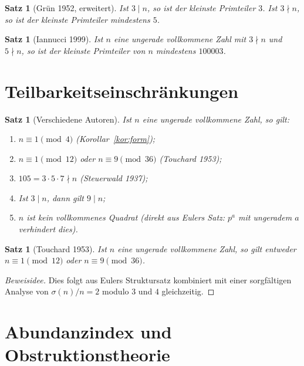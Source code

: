 \documentclass[12pt,a4paper]{amsart}
\newtheorem{satz}[theorem]{Satz}
\theoremstyle{definition}
\theoremstyle{remark}
\begin{document}
\begin{satz}[Grün 1952, erweitert]
Ist $3 \mid n$, so ist der kleinste Primteiler $3$.
Ist $3 \nmid n$, so ist der kleinste Primteiler mindestens $5$.
\end{satz}

\begin{satz}[Iannucci 1999]
Ist $n$ eine ungerade vollkommene Zahl mit $3 \nmid n$ und $5 \nmid n$,
so ist der kleinste Primteiler von $n$ mindestens $100003$.
\end{satz}

\section{Teilbarkeitseinschränkungen}

\begin{satz}[Verschiedene Autoren]
Ist $n$ eine ungerade vollkommene Zahl, so gilt:
\begin{enumerate}[label=(\roman*)]
  \item $n \equiv 1 \pmod{4}$ (Korollar~\ref{kor:form});
  \item $n \equiv 1 \pmod{12}$ oder $n \equiv 9 \pmod{36}$ (Touchard 1953);
  \item $105 = 3 \cdot 5 \cdot 7 \nmid n$ (Steuerwald 1937);
  \item Ist $3 \mid n$, dann gilt $9 \mid n$;
  \item $n$ ist kein vollkommenes Quadrat
        (direkt aus Eulers Satz: $p^a$ mit ungeradem $a$ verhindert dies).
\end{enumerate}
\end{satz}

\begin{satz}[Touchard 1953]
\label{satz:touchard}
Ist $n$ eine ungerade vollkommene Zahl, so gilt entweder
$n \equiv 1 \pmod{12}$ oder $n \equiv 9 \pmod{36}$.
\end{satz}

\begin{proof}[Beweisidee]
Dies folgt aus Eulers Struktursatz kombiniert mit einer sorgfältigen Analyse
von $\sigma(n)/n = 2$ modulo $3$ und $4$ gleichzeitig.
\end{proof}

\section{Abundanzindex und Obstruktionstheorie}
\end{document}

